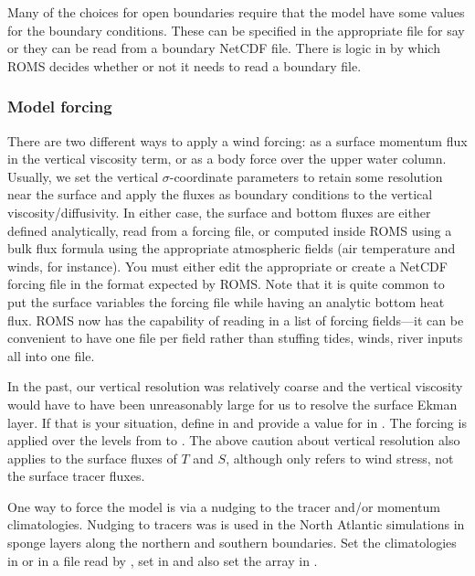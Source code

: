 Many of the choices for open boundaries require that the model have
some values for the boundary conditions. These can be specified in
the appropriate  file for say  or
they can be read from a boundary NetCDF file. There is logic in
 by which ROMS decides whether or not it needs to
read a boundary file.

\subsubsection{Model forcing}
\label{Mforce}

There are two different ways to apply a wind forcing: as a surface
momentum flux in the vertical viscosity term, or as a body force over
the upper water column.
Usually, we set the vertical $\sigma$-coordinate
parameters to retain some resolution near the surface and apply the
fluxes as boundary conditions to the vertical viscosity/diffusivity.
In either case, the surface and bottom fluxes are either defined
analytically, read from a forcing file, or computed inside ROMS
using a bulk flux formula using the appropriate atmospheric fields
(air temperature and winds, for instance).  You must either edit the
appropriate  or create a NetCDF forcing
file in the format expected by ROMS. Note that it is quite common
to put the surface variables the forcing file while having an analytic
bottom heat flux. ROMS now has the capability of reading in a list
of forcing fields---it can be convenient to have one file per field
rather than stuffing tides, winds, river inputs all into one file.

In the past, our vertical resolution was relatively coarse and the
vertical viscosity would have to have been unreasonably large for
us to resolve the surface Ekman layer.  If that is your situation,
define  in  and provide a value for
 in .  The forcing is applied over the
levels from  to .  The above caution about
vertical resolution also applies to the surface fluxes of $T$ and
$S$, although  only refers to wind stress, not the
surface tracer fluxes.

\smallskip
{}

One way to force the model is via a nudging to the tracer and/or
momentum climatologies. Nudging to tracers was is used in the North
Atlantic simulations in sponge layers along the northern and southern
boundaries. Set the climatologies in  or in a
file read by , set  in
 and also set the array  in
.

